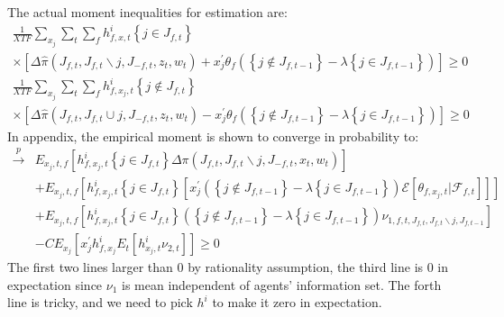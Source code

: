 \documentclass{book}
\theoremstyle{plain}
\theoremstyle{definition}
\begin{document}
The actual moment inequalities for estimation are:
\[\begin{array}{l}{\frac{1}{X T F} \sum_{x_{j}} \sum_{t} \sum_{f} h_{f, x, t}^{i}\left\{j \in J_{f, t}\right\}} \\ { \times\left[\Delta \hat{\pi}\left(J_{f, t}, J_{f, t} \backslash j, J_{-f, t}, z_{t}, w_{t}\right)+x_{j}^{\prime} \theta_{f}\left(\left\{j \notin J_{f, t-1}\right\}-\lambda\left\{j \in J_{f, t-1}\right\}\right)\right] \geq 0}\end{array} \tag{8}\]
\[\begin{array}{l}{\frac{1}{X T F} \sum_{x_{j}} \sum_{t} \sum_{f} h_{f, x_{j}, t}^{i}\left\{j \notin J_{f, t}\right\}} \\ { \times\left[\Delta \hat{\pi}\left(J_{f, t}, J_{f, t} \cup j, J_{-f, t}, z_{t}, w_{t}\right)-x_{j}^{\prime} \theta_{f}\left(\left\{j \notin J_{f, t-1}\right\}-\lambda\left\{j \in J_{f, t-1}\right\}\right)\right] \geq 0}\end{array} \tag{9}\]
In appendix, the empirical moment is shown to converge in probability to:
\begin{align*}
	\stackrel{p}{\rightarrow} & E_{x_{j}, t, f}\left[h_{f, x_{j}, t}^{i}\left\{j \in J_{f, t}\right\} \Delta \pi\left(J_{f, t}, J_{f, t} \backslash j, J_{-f, t}, x_{t}, w_{t}\right)\right] \\
	& +E_{x_{j}, t, f}\left[h_{f, x_{j}, t}^{i}\left\{j \in J_{f, t}\right\}\left[x_{j}^{\prime}\left(\left\{j \notin J_{f, t-1}\right\}-\lambda\left\{j \in J_{f, t-1}\right\}\right) \mathscr{E}\left[\theta_{f, x_{j}, t} | \mathscr{F}_{f, t}\right]\right]\right] \\
	& +E_{x_{j}, t, f}\left[h_{f, x_{j}, t}^{i}\left\{j \in J_{f, t}\right\}\left(\left\{j \notin J_{f, t-1}\right\}-\lambda\left\{j \in J_{f, t-1}\right\}\right) \nu_{1, f, t, J_{f, t}, J_{f, t} \backslash j, J_{f, t-1}}\right] \\
	& -C E_{x_{j}}\left[x_{j}^{\prime} h_{f, x_{j}}^{i} E_{t}\left[h_{x_{j}, t}^{i} \nu_{2, t}\right]\right] \geq 0
\end{align*}
The first two lines larger than 0 by rationality assumption, the third line is 0 in expectation since $\nu_1$ is mean independent of agents' information set. The forth line is tricky, and we need to pick $h^i$ to make it zero in expectation.
\end{document}
